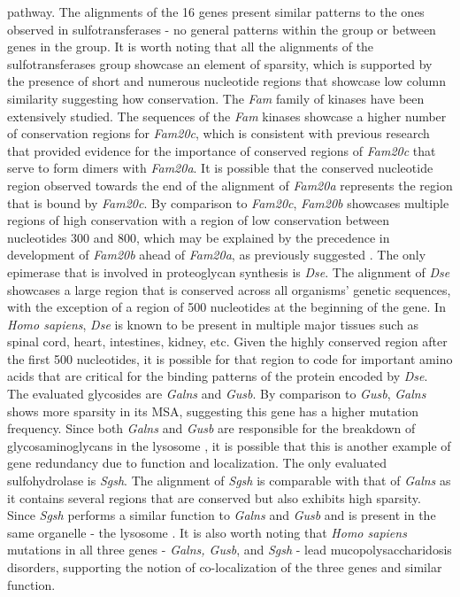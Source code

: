 \documentclass{article}
\begin{document}
pathway. The alignments of the 16 genes present similar patterns to the ones observed in sulfotransferases - no general patterns within the group or between genes in the group. It is worth noting that all the alignments of the sulfotransferases group showcase an element of sparsity, which is supported by the presence of short and numerous nucleotide regions that showcase low column similarity suggesting how conservation. The \textit{Fam} family of kinases have been extensively studied. The sequences of the \textit{Fam} kinases showcase a higher number of conservation regions for \textit{Fam20c}, which is consistent with previous research that provided evidence for the importance of conserved regions of \textit{Fam20c} that serve to form dimers with \textit{Fam20a}\cite{fam20}. It is possible that the conserved nucleotide region observed towards the end of the alignment of \textit{Fam20a} represents the region that is bound by \textit{Fam20c}. By comparison to \textit{Fam20c}, \textit{Fam20b} showcases multiple regions of high conservation with a region of low conservation between nucleotides 300 and 800, which may be explained by the precedence in development of \textit{Fam20b} ahead of \textit{Fam20a}, as previously suggested \cite{fam20}. The only epimerase that is involved in proteoglycan synthesis is \textit{Dse}. The alignment of \textit{Dse} showcases a large region that is conserved across all organisms' genetic sequences, with the exception of a region of 500 nucleotides at the beginning of the gene. In \textit{Homo sapiens}, \textit{Dse} is known to be present in multiple major tissues such as spinal cord, heart, intestines, kidney, etc. Given the highly conserved region after the first 500 nucleotides, it is possible for that region to code for important amino acids that are critical for the binding patterns of the protein encoded by \textit{Dse}. The evaluated glycosides are \textit{Galns} and \textit{Gusb}. By comparison to \textit{Gusb}, \textit{Galns} shows more sparsity in its MSA, suggesting this gene has a higher mutation frequency. Since both \textit{Galns} and \textit{Gusb} are responsible for the breakdown of glycosaminoglycans in the lysosome \cite{galns, gusb}, it is possible that this is another example of gene redundancy due to function and localization. The only evaluated sulfohydrolase is \textit{Sgsh}. The alignment of \textit{Sgsh} is comparable with that of \textit{Galns} as it contains several regions that are conserved but also exhibits high sparsity. Since \textit{Sgsh} performs a similar function to \textit{Galns} and \textit{Gusb} and is present in the same organelle - the lysosome \cite{sgsh}. It is also worth noting that \textit{Homo sapiens} mutations in all three genes - \textit{Galns, Gusb}, and \textit{Sgsh} - lead mucopolysaccharidosis disorders, supporting the notion of co-localization of the three genes and similar function.
\end{document}
